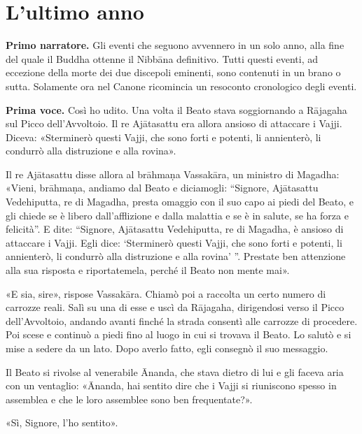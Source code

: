 \chapter{L'ultimo anno}

\textbf{Primo narratore.} Gli eventi che seguono avvennero in un solo anno, alla
fine del quale il Buddha ottenne il Nibbāna definitivo. Tutti questi
eventi, ad eccezione della morte dei due discepoli eminenti, sono
contenuti in un brano o sutta. Solamente ora nel Canone ricomincia un
resoconto cronologico degli eventi.


\textbf{Prima voce.} Così ho udito. Una volta il Beato stava soggiornando a
Rājagaha sul Picco dell’Avvoltoio. Il re Ajātasattu era allora ansioso
di attaccare i Vajji. Diceva: «Sterminerò questi Vajji, che sono forti e
potenti, li annienterò, li condurrò alla distruzione e alla rovina».


Il re Ajātasattu disse allora al brāhmaṇa Vassakāra, un ministro di
Magadha: «Vieni, brāhmaṇa, andiamo dal Beato e diciamogli: “Signore,
Ajātasattu Vedehiputta, re di Magadha, presta omaggio con il suo capo ai
piedi del Beato, e gli chiede se è libero dall’afflizione e dalla
malattia e se è in salute, se ha forza e felicità”. E dite: “Signore,
Ajātasattu Vedehiputta, re di Magadha, è ansioso di attaccare i Vajji.
Egli dice: ‘Sterminerò questi Vajji, che sono forti e potenti, li
annienterò, li condurrò alla distruzione e alla rovina’ ”. Prestate ben
attenzione alla sua risposta e riportatemela, perché il Beato non mente
mai».


«E sia, sire», rispose Vassakāra. Chiamò poi a raccolta un certo numero
di carrozze reali. Salì su una di esse e uscì da Rājagaha, dirigendosi
verso il Picco dell’Avvoltoio, andando avanti finché la strada consentì
alle carrozze di procedere. Poi scese e continuò a piedi fino al luogo
in cui si trovava il Beato. Lo salutò e si mise a sedere da un lato.
Dopo averlo fatto, egli consegnò il suo messaggio.


Il Beato si rivolse al venerabile Ānanda, che stava dietro di lui e gli
faceva aria con un ventaglio: «Ānanda, hai sentito dire che i Vajji si
riuniscono spesso in assemblea e che le loro assemblee sono ben
frequentate?».


«Sì, Signore, l’ho sentito».


